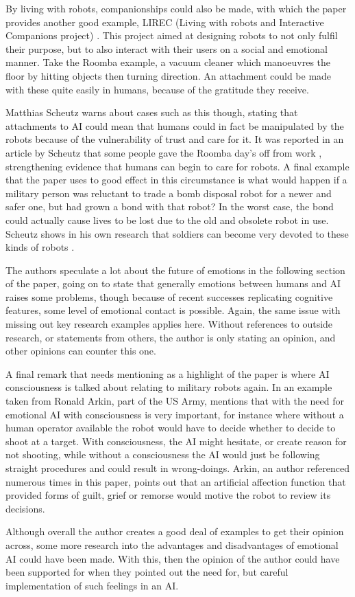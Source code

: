 \documentclass[article]{IEEEtran}
\begin{document}
By living with robots, companionships could also be made, with which the paper provides another good example, LIREC (Living with robots and Interactive Companions project) \cite{lirec}. This project aimed at designing robots to not only fulfil their purpose, but to also interact with their users on a social and emotional manner. Take the Roomba example, a vacuum cleaner which manoeuvres the floor by hitting objects then turning direction. An attachment could be made with these quite easily in humans, because of the gratitude they receive. \par
Matthias Scheutz warns about cases such as this though, stating that attachments to AI could mean that humans could in fact be manipulated by the robots because of the vulnerability of trust and care for it. It was reported in an article by Scheutz that some people gave the Roomba day's off from work \cite{ethicsMilitary}, strengthening evidence that humans can begin to care for robots. A final example that the paper uses to good effect in this circumstance is what would happen if a military person was reluctant to trade a bomb disposal robot for a newer and safer one, but had grown a bond with that robot? In the worst case, the bond could actually cause lives to be lost due to the old and obsolete robot in use. Scheutz shows in his own research that soldiers can become very devoted to these kinds of robots \cite{ethicsMilitary}. \par
The authors speculate a lot about the future of emotions in the following section of the paper, going on to state that generally emotions between humans and AI raises some problems, though because of recent successes replicating cognitive features, some level of emotional contact is possible. Again, the same issue with missing out key research examples applies here. Without references to outside research, or statements from others, the author is only stating an opinion, and other opinions can counter this one. \par
A final remark that needs mentioning as a highlight of the paper is where AI consciousness is talked about relating to military robots again. In an example taken from Ronald Arkin, part of the US Army, mentions that with the need for emotional AI with consciousness is very important, for instance where without a human operator available the robot would have to decide whether to decide to shoot at a target. With consciousness, the AI might hesitate, or create reason for not shooting, while without a consciousness the AI would just be following straight procedures and could result in wrong-doings. Arkin, an author referenced numerous times in this paper, points out that an artificial affection function that provided forms of guilt, grief or remorse would motive the robot to review its decisions. \par
Although overall the author creates a good deal of examples to get their opinion across, some more research into the advantages and disadvantages of emotional AI could have been made. With this, then the opinion of the author could have been supported for when they pointed out the need for, but careful implementation of such feelings in an AI.
\end{document}

